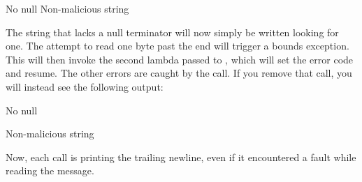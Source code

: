 \begin{console}
No null
Non-malicious string
\end{console}

The string that lacks a null terminator will now simply be written looking for one.
The attempt to read one byte past the end will trigger a bounds exception.
This will then invoke the second lambda passed to , which will set the error code and resume.
The other errors are caught by the  call.
If you remove that call, you will instead see the following output:

\begin{console}
No null


Non-malicious string
\end{console}

Now, each call is printing the trailing newline, even if it encountered a fault while reading the message.

